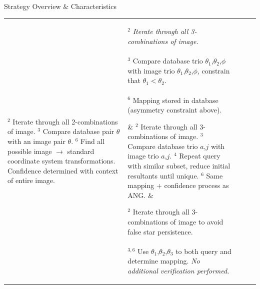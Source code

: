 \documentclass{beamer}
\newlength{\twocolwid}
\begin{document}
\begin{frame}[t]
\begin{columns}[t]
\begin{column}{\twocolwid}
\begin{block}{Strategy Overview \& Characteristics}
\begin{table}
\begin{tabularx}{\linewidth}[t]{XXXXX}
							\parbox[t]{0.95\linewidth}{\small{
								${}^2$ Iterate through all 2-combinations of image. 
								\\ \vspace*{-0.1cm} \\
								${}^3$ Compare database pair $\theta$ with an image pair $\theta$.
								\\ \vspace*{-0.1cm} \\
								${}^6$ Find all possible image $\rightarrow$ standard coordinate system transformations. Confidence determined with context of entire image.
							}} 
							&
							\parbox[t]{0.95\linewidth}{\small{
								${}^2$ \emph{Iterate through all 3-combinations of image.}
								\\ \vspace*{-0.1cm} \\
								${}^3$ Compare database trio $\theta_1$,$\theta_2$,$\phi$ with image trio $\theta_1$,$\theta_2$,$\phi$, constrain that $\theta_1{<}\theta_2$.
								\\ \vspace*{-0.1cm} \\
								${}^6$ Mapping stored in database (asymmetry constraint above).
							}}
							&
							\parbox[t]{0.95\linewidth}{\small{
								${}^2$ Iterate through all 3-combinations of image.
								\\ \vspace*{-0.1cm} \\
								${}^3$ Compare database trio $a$,$j$ with image trio $a$,$j$.
								\\ \vspace*{-0.1cm} \\
								${}^4$ Repeat query with similar subset, reduce initial resultants until unique.
								\\ \vspace*{-0.1cm} \\
								${}^{6}$ Same mapping + confidence process as ANG.
							}}
							&
							\parbox[t]{0.95\linewidth}{\small{
								${}^2$ Iterate through all 3-combinations of image to avoid false star persistence.
								\\ \vspace*{-0.1cm} \\
								${}^{3,6}$ Use $\theta_1$,$\theta_2$,$\theta_3$ to both query and determine mapping. \emph{No additional verification performed.}
}}
\end{tabularx}
\end{table}
\end{block}
\end{column}
\end{columns}
\end{frame}
\end{document}
